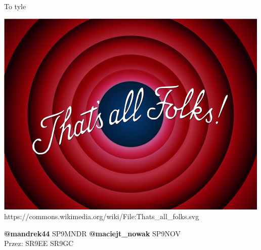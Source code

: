 \documentclass[ignorenonframetext]{beamer}
\begin{document}
\begin{frame}{To tyle}
\begin{center}
	\includegraphics[scale=0.4]{images/thats-all.png}
	\tiny{https://commons.wikimedia.org/wiki/File:Thats\_all\_folks.svg}
\end{center}
\begin{beamerboxesrounded}{}
	\begin{center}
		\textbf{@mandrek44} SP9MNDR \textbf{@maciejt\_nowak} SP9NOV\\
		Przez: SR9EE SR9GC
	\end{center}
\end{beamerboxesrounded}
\end{frame}
\end{document}
